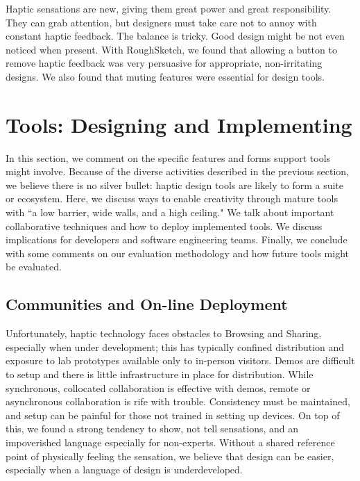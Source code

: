 Haptic sensations are new, giving them great power and great responsibility.
They can grab attention, but designers must take care not to annoy with constant haptic feedback.
The balance is tricky. 
Good design might be not even noticed when present.
With RoughSketch, we found that allowing a button to remove haptic feedback was very persuasive for appropriate, non-irritating designs.
We also found that muting features were essential for \haxd design tools.






\section{\haxd Tools: Designing and Implementing}
In this section, we comment on the specific features and forms \haxd support tools might involve.
Because of the diverse activities described in the previous section, we believe there is no silver bullet: haptic design tools are likely to form a suite or ecosystem.
Here, we discuss ways to enable creativity through mature tools with ``a low barrier, wide walls, and a high ceiling."
We talk about important collaborative techniques and how to deploy implemented tools.
We discuss implications for developers and software engineering teams.
Finally, we conclude with some comments on our evaluation methodology and how future \haxd tools might be evaluated.


\subsection{Communities and On-line Deployment}
Unfortunately, haptic technology faces obstacles to Browsing and Sharing, especially when under development; this has typically confined distribution and exposure to lab prototypes available only to in-person visitors.
Demos are difficult to setup and there is little infrastructure in place for distribution.
While synchronous, collocated collaboration is effective with demos, remote or asynchronous collaboration is rife with trouble.
Consistency must be maintained, and setup can be painful for those not trained in setting up devices.
On top of this, we found a strong tendency to show, not tell sensations, and an impoverished language especially for non-experts.
Without a shared reference point of physically feeling the sensation, we believe that design can be easier, especially when a language of design is underdeveloped.

